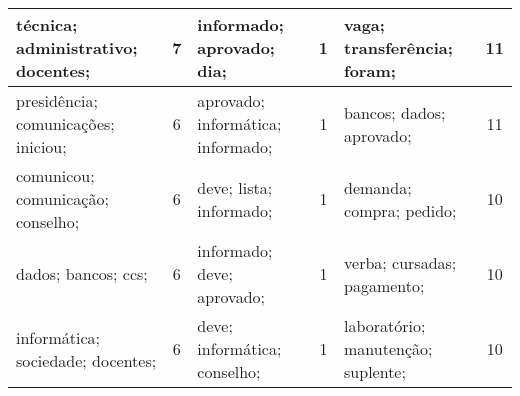 \begin{table}[!h]
\begin{tabular}{|l|c||l|c||l|c|}
   técnica; administrativo; docentes; &   7  &         informado; aprovado; dia; &   1  &       vaga; transferência; foram; &   11  \\ \hline
   presidência; comunicações; iniciou; &   6  &         aprovado; informática; informado; &   1  &       bancos; dados; aprovado; &   11  \\ \hline
   comunicou; comunicação; conselho; &   6  &         deve; lista; informado; &   1  &       demanda; compra; pedido; &   10  \\ \hline
   dados; bancos; ccs; &   6  &         informado; deve; aprovado; &   1  &       verba; cursadas; pagamento; &   10  \\ \hline
   informática; sociedade; docentes; &   6  &         deve; informática; conselho; &   1  &       laboratório; manutenção; suplente; &   10  \\ \hline

\end{tabular}
\end{table}
